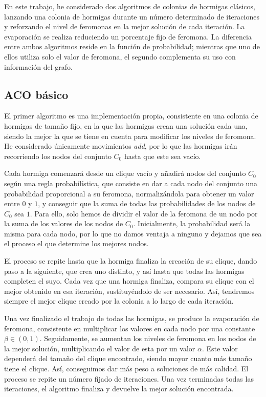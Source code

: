 En este trabajo, he considerado dos algoritmos de colonias de hormigas clásicos,
lanzando una colonia de hormigas durante un número determinado de iteraciones y
reforzando el nivel de feromonas en la mejor solución de cada iteración.
La evaporación se realiza reduciendo un porcentaje fijo de feromona.
La diferencia entre ambos algoritmos reside en la función de probabilidad;
mientras que uno de ellos utiliza solo el valor de feromona, el segundo complementa
su uso con información del grafo.

\subsection{ACO básico}\label{aco1}

El primer algoritmo es una implementación propia, consistente en una colonia de
hormigas de tamaño fijo, en la que las hormigas crean una solución cada una,
siendo la mejor la que se tiene en cuenta para modificar los niveles de feromona.
He considerado únicamente movimientos \textit{add}, por lo que las hormigas irán
recorriendo los nodos del conjunto $C_0$ hasta que este sea vacío.

Cada hormiga comenzará desde un clique vacío y añadirá nodos del conjunto $C_0$ según
una regla probabilística, que consiste en dar a cada nodo del conjunto una probabilidad
proporcional a su feromona, normalizándola para obtener un valor entre $0$ y $1$, y
conseguir que la suma de todas las probabilidades de los nodos de $C_0$ sea $1$.
Para ello,  solo hemos de dividir el valor de la feromona de un nodo por la suma de
los valores de los nodos de $C_0$. Inicialmente, la probabilidad será la misma para
cada nodo,  por lo que no damos ventaja a ninguno y dejamos que sea el proceso el
que determine los mejores nodos.

El proceso se repite hasta que la hormiga finaliza la creación de su clique, dando
paso a la siguiente, que crea uno distinto, y así hasta que todas las hormigas completen
el suyo. Cada vez que una hormiga finaliza, compara su clique con el mejor obtenido
en esa iteración, sustituyéndolo de ser necesario. Así, tendremos siempre el mejor
clique creado por la colonia a lo largo de cada iteración.

Una vez finalizado el trabajo de todas las hormigas, se produce la evaporación de
feromona, consistente en multiplicar los valores en cada nodo por una constante $\beta
\in (0, 1)$. Seguidamente, se aumentan los niveles de feromona en los nodos de la mejor
solución, multiplicando el valor de esta por un valor $\alpha$. Este valor dependerá del
tamaño del clique encontrado, siendo mayor cuanto más tamaño tiene el clique. Así,
conseguimos dar más peso a soluciones de más calidad. El proceso se repite un número
fijado de iteraciones. Una vez terminadas todas las iteraciones, el algoritmo finaliza
y devuelve la mejor solución encontrada.

